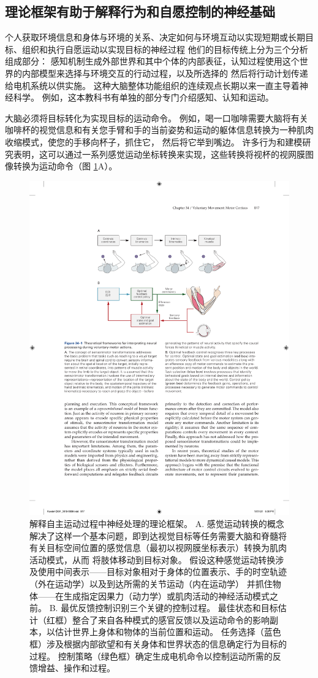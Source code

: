 \subsection{理论框架有助于解释行为和自愿控制的神经基础}

个人获取环境信息和身体与环境的关系、决定如何与环境互动以实现短期或长期目标、组织和执行自愿运动以实现目标的神经过程 他们的目标传统上分为三个分析组成部分：
感知机制生成外部世界和其中个体的内部表征，认知过程使用这个世界的内部模型来选择与环境交互的行动过程，以及所选择的 然后将行动计划传递给电机系统以供实施。
这种大脑整体功能组织的连续观点长期以来一直主导着神经科学。
例如，这本教科书有单独的部分专门介绍感知、认知和运动。


大脑必须将目标转化为实现目标的运动命令。
例如，喝一口咖啡需要大脑将有关咖啡杯的视觉信息和有关您手臂和手的当前姿势和运动的躯体信息转换为一种肌肉收缩模式，使您的手移向杯子，抓住它， 然后将它举到嘴边。
许多行为和建模研究表明，这可以通过一系列感觉运动坐标转换来实现，这些转换将视杯的视网膜图像转换为运动命令（图 \ref{fig:34_1}A）。


\begin{figure}[htbp]
	\centering
	\includegraphics[width=0.75\linewidth]{chap34/fig_34_1}
	\caption{解释自主运动过程中神经处理的理论框架。
		A. 感觉运动转换的概念解决了这样一个基本问题，即到达视觉目标等任务需要大脑和脊髓将有关目标空间位置的感觉信息（最初以视网膜坐标表示）转换为肌肉活动模式，从而 将肢体移动到目标对象。 
		假设这种感觉运动转换涉及使用中间表示——目标对象相对于身体的位置表示、手的时空轨迹（外在运动学）以及到达所需的关节运动（内在运动学） 并抓住物体——在生成指定因果力（动力学）或肌肉活动的神经活动模式之前。 
		B. 最优反馈控制识别三个关键的控制过程。 
		最佳状态和目标估计（红框）整合了来自各种模式的感官反馈以及运动命令的影响副本，以估计世界上身体和物体的当前位置和运动。 
		任务选择（蓝色框）涉及根据内部欲望和有关身体和世界状态的信息确定行为目标的过程。 
		控制策略（绿色框）确定生成电机命令以控制运动所需的反馈增益、操作和过程。}
	\label{fig:34_1}
\end{figure}


